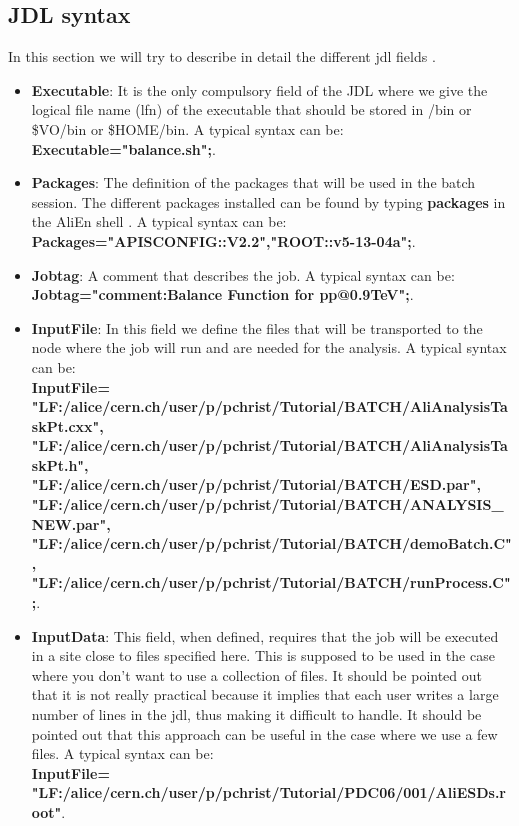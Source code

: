 \subsection{JDL syntax}

In this section we will try to describe in detail the different jdl fields \cite{Note:RefGSHELL}.

\begin{itemize}
\item \textbf{Executable}: It is the only compulsory field of the JDL where we give the logical file name (lfn) of the executable that should be stored in /bin or \$VO/bin or \$HOME/bin. A typical syntax can be: \\{\ttfamily \textbf{Executable="balance.sh";}}.

\item \textbf{Packages}: The definition of the packages that will be used in the batch session. The different packages installed can be found by typing \textbf{packages} in the AliEn shell \cite{Note:RefGSHELL}. A typical syntax can be: \\{\ttfamily \textbf{Packages={"APISCONFIG::V2.2","ROOT::v5-13-04a"};}}.

\item \textbf{Jobtag}: A comment that describes the job. A typical syntax can be: \\{\ttfamily \textbf{Jobtag={"comment:Balance Function for pp@0.9TeV"};}}.

\item \textbf{InputFile}: In this field we define the files that will be transported to the node where the job will run and are needed for the analysis. A typical syntax can be: \\{\ttfamily \textbf{InputFile= {\\"LF:/alice/cern.ch/user/p/pchrist/Tutorial/BATCH/AliAnalysisTaskPt.cxx",\\"LF:/alice/cern.ch/user/p/pchrist/Tutorial/BATCH/AliAnalysisTaskPt.h",\\"LF:/alice/cern.ch/user/p/pchrist/Tutorial/BATCH/ESD.par", \\"LF:/alice/cern.ch/user/p/pchrist/Tutorial/BATCH/ANALYSIS\_NEW.par", \\"LF:/alice/cern.ch/user/p/pchrist/Tutorial/BATCH/demoBatch.C",\\"LF:/alice/cern.ch/user/p/pchrist/Tutorial/BATCH/runProcess.C"};}}.

\item \textbf{InputData}: This field, when defined, requires that the job will be executed in a site close to files specified here. This is supposed to be used in the case where you don't want to use a collection of files. It should be pointed out that it is not really practical because it implies that each user writes a large number of lines in the jdl, thus making it difficult to handle. It should be pointed out that this approach can be useful in the case where we use a few files. A typical syntax can be: \\{\ttfamily \textbf{InputFile= {\\"LF:/alice/cern.ch/user/p/pchrist/Tutorial/PDC06/001/AliESDs.root"}}}.


\end{itemize}
